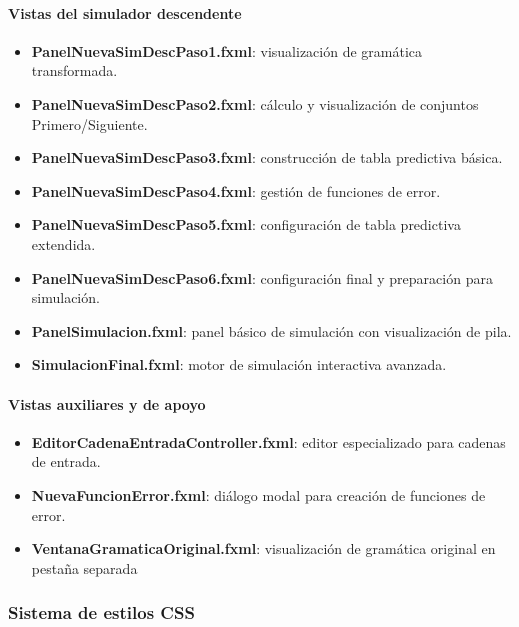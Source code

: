 \paragraph{Vistas del simulador descendente}
\begin{itemize}
    \item \textbf{PanelNuevaSimDescPaso1.fxml}: visualización de gramática transformada.
    \item \textbf{PanelNuevaSimDescPaso2.fxml}: cálculo y visualización de conjuntos Primero/Siguiente.
    \item \textbf{PanelNuevaSimDescPaso3.fxml}: construcción de tabla predictiva básica.
    \item \textbf{PanelNuevaSimDescPaso4.fxml}: gestión de funciones de error.
    \item \textbf{PanelNuevaSimDescPaso5.fxml}: configuración de tabla predictiva extendida.
    \item \textbf{PanelNuevaSimDescPaso6.fxml}: configuración final y preparación para simulación.
    \item \textbf{PanelSimulacion.fxml}: panel básico de simulación con visualización de pila.
    \item \textbf{SimulacionFinal.fxml}: motor de simulación interactiva avanzada.
\end{itemize}

\paragraph{Vistas auxiliares y de apoyo}
\begin{itemize}
    \item \textbf{EditorCadenaEntradaController.fxml}: editor especializado para cadenas de entrada.
    \item \textbf{NuevaFuncionError.fxml}: diálogo modal para creación de funciones de error.
    \item \textbf{VentanaGramaticaOriginal.fxml}: visualización de gramática original en pestaña separada
\end{itemize}

\subsubsection{Sistema de estilos CSS}

